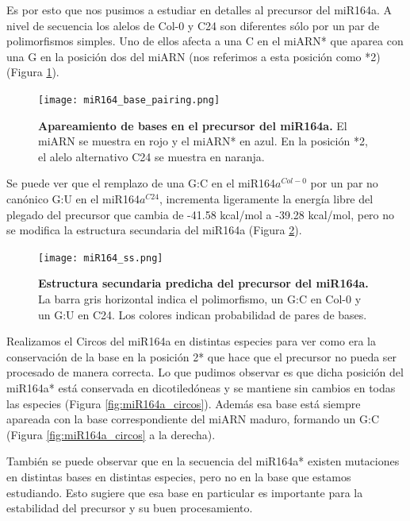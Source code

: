 Es por esto que nos pusimos a estudiar en detalles al precursor del miR164a.
A nivel de secuencia los alelos de Col-0 y C24 son diferentes sólo por un par de polimorfismos simples.
Uno de ellos afecta a una C en el miARN* que aparea con una G en la posición dos del miARN (nos referimos a esta posición como *2) (Figura \ref{fig:miR164_base_pairing}).

\begin{figure}[htbp!] 
	\centering    
	\texttt{[image: miR164\_base\_pairing.png]}
	\caption[Apareamiento de bases en el precursor del miR164a]{
		\textbf{Apareamiento de bases en el precursor del miR164a.}
		El miARN se muestra en rojo y el miARN* en azul.
		En la posición *2, el alelo alternativo C24 se muestra en naranja.
	}
	\label{fig:miR164_base_pairing}
\end{figure}

Se puede ver que el remplazo de una G:C en el miR164$a^{Col-0}$ por un par no canónico G:U en el miR164$a^{C24}$, incrementa ligeramente la energía libre del plegado del precursor que cambia de -41.58 kcal/mol a -39.28 kcal/mol, pero no se modifica la estructura secundaria del miR164a (Figura \ref{fig:miR164_ss}). 

\begin{figure}[htbp!] 
	\centering    
	\texttt{[image: miR164\_ss.png]}
	\caption[Estructura secundaria predicha del precursor del miR164a]{
	\textbf{Estructura secundaria predicha del precursor del miR164a.}
	La barra gris horizontal indica el polimorfismo, un G:C en Col-0 y un G:U en C24.
	Los colores indican probabilidad de pares de bases.
	}
	\label{fig:miR164_ss}
\end{figure}

Realizamos el Circos del miR164a en distintas especies para ver como era la conservación de la base en la posición 2* que hace que el precursor no pueda ser procesado de manera correcta.
Lo que pudimos observar es que dicha posición del miR164a* está conservada en dicotiledóneas y se mantiene sin cambios en todas las especies (Figura \ref{fig:miR164a_circos}).
Además esa base está siempre apareada con la base correspondiente del miARN maduro, formando un G:C (Figura \ref{fig:miR164a_circos} a la derecha).

También se puede observar que en la secuencia del miR164a* existen mutaciones en distintas bases en distintas especies, pero no en la base que estamos estudiando.
Esto sugiere que esa base en particular es importante para la estabilidad del precursor y su buen procesamiento.

